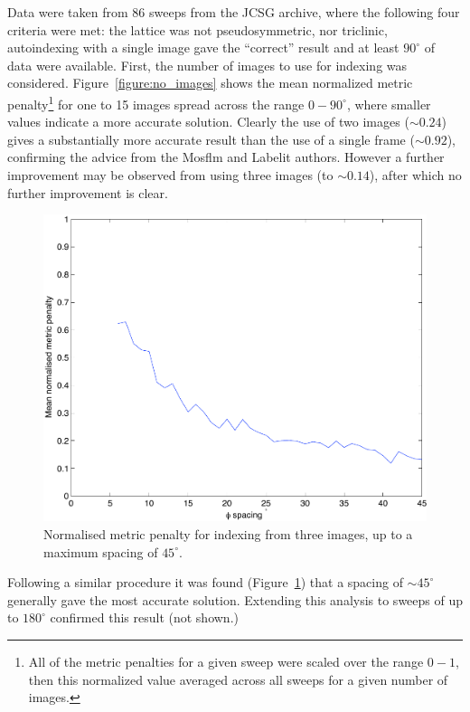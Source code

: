 \documentclass[preprint,pdf]{iucr}
\begin{document}
Data were taken from 86 sweeps from the JCSG archive, where  the
following four
criteria were met: the lattice was not pseudosymmetric, nor triclinic,
autoindexing with a single image gave the ``correct'' result and at
least $90^{\circ}$ of data were available. First, the number of images
to use for indexing was considered. Figure~\ref{figure:no_images}
shows the mean 
normalized metric penalty\footnote{All of the metric penalties for a
  given sweep were scaled over the range $0 - 1$, then this normalized
  value averaged across all sweeps for a given number of images.} for
one to 15 images spread across the range $0 - 90^{\circ}$, where
smaller values indicate a more accurate solution. Clearly the use of
two images ($\sim 0.24$) gives a substantially more accurate result
than the use of a single frame ($\sim 0.92$), 
confirming the advice from the Mosflm and
Labelit authors. However a further improvement may be observed from
using three images (to $\sim 0.14$), after which no further
improvement is clear.  

\begin{figure}
\caption{Normalised metric penalty for indexing from three images, up
  to a maximum spacing of $45^{\circ}$.
\label{figure:phi_spacing_45a}}
\centering
\includegraphics[scale=0.5]{figures/phi_spacing_45a.pdf}
\end{figure}

Following a similar procedure it was found
(Figure~\ref{figure:phi_spacing_45a}) that a 
spacing of $\sim 45^{\circ}$ generally gave the most accurate
solution. Extending this analysis to sweeps of up to $180^{\circ}$
confirmed this result (not shown.) 
\end{document}
